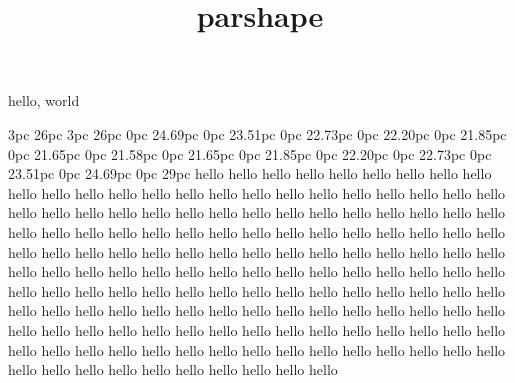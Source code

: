 \documentclass{amsart}
\title{parshape}
\begin{document}
\maketitle

hello, world

\the\parshape

3pc 26pc
3pc 26pc
0pc 24.69pc
0pc 23.51pc
0pc 22.73pc
0pc 22.20pc
0pc 21.85pc
0pc 21.65pc
0pc 21.58pc
0pc 21.65pc
0pc 21.85pc
0pc 22.20pc
0pc 22.73pc
0pc 23.51pc
0pc 24.69pc
0pc 29pc
hello hello hello hello hello hello hello hello hello hello hello hello hello hello hello hello hello hello hello hello hello hello hello hello hello hello hello hello hello hello hello hello hello hello hello hello hello hello hello hello hello hello hello hello hello hello hello hello hello hello hello hello hello hello hello hello hello hello hello hello hello hello hello hello hello hello hello hello hello hello hello hello hello hello hello hello hello hello hello hello hello hello hello hello hello hello hello hello hello hello hello hello hello hello hello hello hello hello hello hello hello hello hello hello hello hello hello hello hello hello hello hello hello hello hello hello hello hello hello hello hello hello hello hello hello hello hello hello hello hello hello hello hello hello hello hello hello hello hello hello hello hello hello hello hello hello hello hello hello hello hello hello hello hello 
\the\parshape

\the\parshape
\end{document}
